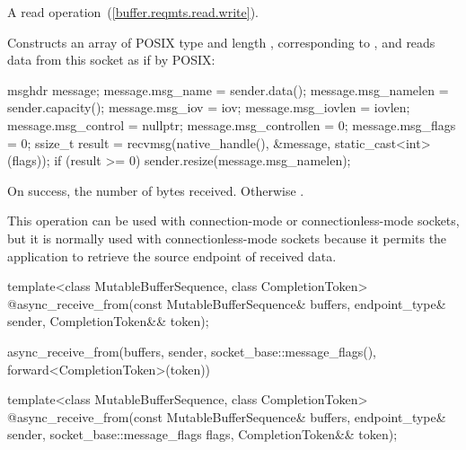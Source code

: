 \begin{itemdescr}
\pnum
A read operation~(\ref{buffer.reqmts.read.write}).

\pnum
\effects Constructs an array  of POSIX type  and length , corresponding to , and reads data from this socket as if by POSIX:
\begin{codeblock}
msghdr message;
message.msg_name = sender.data();
message.msg_namelen = sender.capacity();
message.msg_iov = iov;
message.msg_iovlen = iovlen;
message.msg_control = nullptr;
message.msg_controllen = 0;
message.msg_flags = 0;
ssize_t result = recvmsg(native_handle(), &message, static_cast<int>(flags));
if (result >= 0)
  sender.resize(message.msg_namelen);
\end{codeblock}


\pnum
\returns On success, the number of bytes received. Otherwise .

\pnum
 \begin{note} This operation can be used with connection-mode or connectionless-mode sockets, but it is normally used with connectionless-mode sockets because it permits the application to retrieve the source endpoint of received data. \end{note}
\end{itemdescr}

\begin{itemdecl}
template<class MutableBufferSequence, class CompletionToken>
  @\DEDUCED@ async_receive_from(const MutableBufferSequence& buffers,
                             endpoint_type& sender,
                             CompletionToken&& token);
\end{itemdecl}

\begin{itemdescr}
\pnum
\returns
\begin{codeblock}
async_receive_from(buffers, sender, socket_base::message_flags(),
                   forward<CompletionToken>(token))
\end{codeblock}
\end{itemdescr}

\begin{itemdecl}
template<class MutableBufferSequence, class CompletionToken>
  @\DEDUCED@ async_receive_from(const MutableBufferSequence& buffers,
                             endpoint_type& sender,
                             socket_base::message_flags flags,
                             CompletionToken&& token);
\end{itemdecl}

